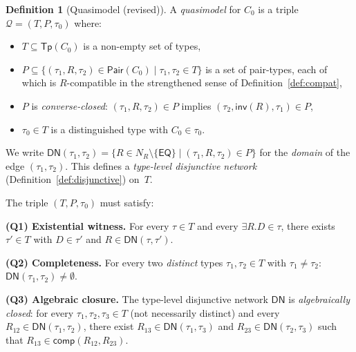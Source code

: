 \documentclass[a4paper,11pt]{article}
\theoremstyle{definition}
\newtheorem{definition}[theorem]{Definition}
\newcommand{\NR}{\ensuremath{N_R}}
\newcommand{\EQ}{\ensuremath{\mathsf{EQ}}}
\newcommand{\inv}{\ensuremath{\mathsf{inv}}}
\newcommand{\comp}{\ensuremath{\mathsf{comp}}}
\newcommand{\Tp}{\ensuremath{\mathsf{Tp}}}
\newcommand{\Pair}{\ensuremath{\mathsf{Pair}}}
\begin{document}
\begin{definition}[Quasimodel (revised)]
\label{def:quasimodel}
A \emph{quasimodel} for $C_0$ is a triple $\mathcal{Q} = (T, P,
\tau_0)$ where:
\begin{itemize}[nosep]
  \item $T \subseteq \Tp(C_0)$ is a non-empty set of types,
  \item $P \subseteq \{(\tau_1, R, \tau_2) \in \Pair(C_0) \mid
    \tau_1, \tau_2 \in T\}$ is a set of pair-types, each of which is
    $R$-compatible in the strengthened sense of
    Definition~\ref{def:compat},
  \item $P$ is \emph{converse-closed}: $(\tau_1, R, \tau_2) \in P$
    implies $(\tau_2, \inv(R), \tau_1) \in P$,
  \item $\tau_0 \in T$ is a distinguished type with $C_0 \in \tau_0$.
\end{itemize}
We write $\mathsf{DN}(\tau_1, \tau_2) = \{R \in \NR \setminus \{\EQ\}
\mid (\tau_1, R, \tau_2) \in P\}$ for the \emph{domain} of the edge
$(\tau_1, \tau_2)$.  This defines a \emph{type-level disjunctive
network} (Definition~\ref{def:disjunctive}) on~$T$.

\medskip\noindent
The triple $(T, P, \tau_0)$ must satisfy:

\medskip\noindent
\textbf{(Q1) Existential witness.}\; For every $\tau \in T$ and every
$\exists R.D \in \tau$, there exists $\tau' \in T$ with $D \in \tau'$
and $R \in \mathsf{DN}(\tau, \tau')$.

\medskip\noindent
\textbf{(Q2) Completeness.}\; For every two \emph{distinct} types
$\tau_1, \tau_2 \in T$ with $\tau_1 \neq \tau_2$:
$\mathsf{DN}(\tau_1, \tau_2) \neq \emptyset$.

\medskip\noindent
\textbf{(Q3) Algebraic closure.}\; The type-level disjunctive
network $\mathsf{DN}$ is \emph{algebraically closed}: for every
$\tau_1, \tau_2, \tau_3 \in T$ (not necessarily distinct) and every
$R_{12} \in \mathsf{DN}(\tau_1, \tau_2)$, there exist $R_{13} \in
\mathsf{DN}(\tau_1, \tau_3)$ and $R_{23} \in
\mathsf{DN}(\tau_2, \tau_3)$ such that $R_{13} \in
\comp(R_{12}, R_{23})$.
\end{definition}
\end{document}
